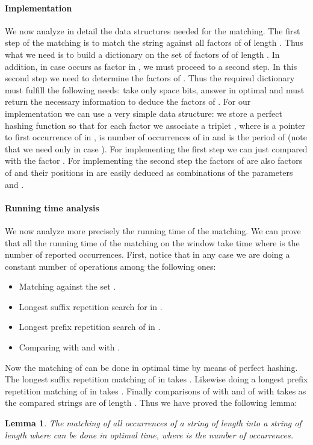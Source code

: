 \documentclass{article}
\newcommand{\?}{\mskip1.5mu}
\newtheorem{lemma}{Lemma}
\begin{document}
\paragraph{Implementation}
We now analyze in detail the data structures needed for the matching. The first step of the matching is to match the string  against all factors of  of length . Thus what we need is to build a dictionary on the set of factors of  of length . In addition, in case  occurs as factor in , we must proceed to a second step. In this second step we need to determine the factors  of . 
Thus the required dictionary must fulfill the following needs: take only space  bits, answer in optimal  and must return the necessary information to deduce the factors  of . 
For our implementation we can use a very simple data structure: we store a perfect hashing function so that for each factor  we associate a triplet , where  is a pointer to first occurrence of  in ,  is number of occurrences of  in  and  is the period of  (note that we need  only in case ). For implementing the first step we can just compared  with the factor . For implementing the second step the factors  of  are also factors of  and their positions in  are easily deduced as combinations of the parameters   and . 
\paragraph{Running time analysis}
We now analyze more precisely the running time of the matching. We can prove that all the running time of the matching on the window  take time  where  is the number of reported occurrences. First, notice that in any case we are doing a constant number of operations among the following ones:
\begin{itemize}
\item Matching  against the set . 
\item Longest suffix repetition search for  in .
\item Longest prefix repetition search of  in . 
\item Comparing  with  and  with . 
\end{itemize}
Now the matching of  can be done in optimal  time by means of perfect hashing. The longest suffix repetition matching of  in  takes . Likewise doing a longest prefix repetition matching of  in  takes . Finally comparisons of  with  and of  with  takes  as the compared strings are of length . Thus we have proved the following lemma:
\begin{lemma}
The matching of all occurrences of a string  of length  into a string  of length  where  can be done in optimal  time, where  is the number of occurrences.
\end{lemma}
\end{document}

